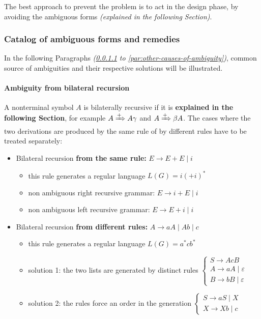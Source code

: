 \documentclass[english]{article}
\begin{document}
The best approach to prevent the problem is to act in the design phase, by avoiding the ambiguous forms \textit{(explained in the following Section)}.

\subsubsection{Catalog of ambiguous forms and remedies}

In the following Paragraphs \textit{(\ref{par:ambiguity-from-bilateral-recursion} to \ref{par:other-causes-of-ambiguity})}, common source of ambiguities and their respective solutions will be illustrated.

\paragraph{Ambiguity from bilateral recursion}
\label{par:ambiguity-from-bilateral-recursion}

A nonterminal symbol \(A\) is bilaterally recursive if it is \textbf{explained in the following Section}, for example \(A \xRightarrow{+} A \gamma\) and \(A \xRightarrow{+} \beta A\).
The cases where the two derivations are produced by the same rule of by different rules have to be treated separately:

\begin{itemize}
  \item Bilateral recursion \textbf{from the same rule:} \(E \rightarrow E + E \mid i\)
        \begin{itemize}
          \item this rule generates a regular language \(L(G) = i (+i)^\ast\)
          \item non ambiguous right recursive grammar: \(E \rightarrow i + E \mid i\)
          \item non ambiguous left recursive grammar: \(E \rightarrow E + i \mid i\)
        \end{itemize}
  \item Bilateral recursion \textbf{from different rules:} \(A \rightarrow aA \mid Ab \mid c\)
        \begin{itemize}
          \item this rule generates a regular language \(L(G) = a^\ast c b^\ast\)
          \item solution 1: the two lists are generated by distinct rules
                \(\begin{cases}
                  S  \rightarrow AcB                 \\
                  A  \rightarrow aA \mid \varepsilon \\
                  B  \rightarrow bB \mid \varepsilon
                \end{cases}\)
          \item solution 2: the rules force an order in the generation
                \(\begin{cases}
                  S \rightarrow aS \mid X \\
                  X \rightarrow Xb \mid c
                \end{cases}\)
        \end{itemize}
\end{itemize}
\end{document}

